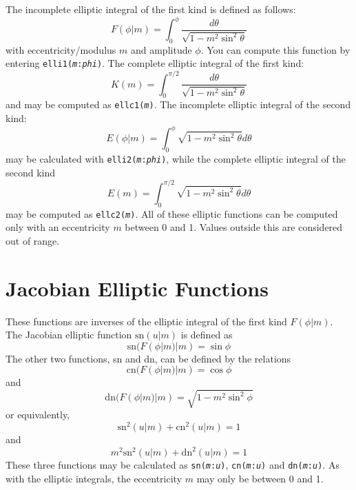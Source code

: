 \documentclass{article}
\begin{document}
The incomplete elliptic integral of the first kind is defined as
follows:
\begin{equation}
F(\phi | m) = \int^\phi_0 \frac{d\theta}{\sqrt{1 - m^2 \sin^2 \theta}}
\end{equation}
with eccentricity/modulus $m$ and amplitude $\phi$.  You can compute
this function by entering \texttt{elli1(\textsl{m}:\textsl{phi})}.
The complete elliptic integral of the first kind:
\begin{equation}
K(m) = \int^{\pi/2}_0 \frac{d\theta}{\sqrt{1 - m^2 \sin^2 \theta}}
\end{equation}
and may be computed as \texttt{ellc1(\textsl{m})}.  The incomplete
elliptic integral of the second kind:
\begin{equation}
E(\phi | m) = \int^\phi_0 \sqrt{1 - m^2 \sin^2 \theta} d\theta
\end{equation}
may be calculated with \texttt{elli2(\textsl{m}:\textsl{phi})}, while
the complete elliptic integral of the second kind
\begin{equation}
E(m) = \int^{\pi/2}_0 \sqrt{1 - m^2 \sin^2 \theta} d\theta
\end{equation}
may be computed as \texttt{ellc2(\textsl{m})}.  All of these elliptic
functions can be computed only with an eccentricity $m$ between 0 and
1.  Values outside this are considered out of range.

\section*{Jacobian Elliptic Functions}

These functions are inverses of the elliptic integral of the first
kind $F(\phi | m)$.  The Jacobian elliptic function $\mathrm{sn}(u|m)$
is defined as
\begin{equation}
\mathrm{sn}(F(\phi | m) | m) = \sin \phi
\end{equation}
The other two functions, sn and dn, can be defined by the relations
\begin{equation}
\mathrm{cn}(F(\phi | m) | m) = \cos \phi
\end{equation}
and
\begin{equation}
\mathrm{dn}(F(\phi | m) | m) = \sqrt{1-m^2\sin^2 \phi}
\end{equation}
or equivalently,
\begin{equation}
\mathrm{sn}^2(u | m) + \mathrm{cn}^2(u | m) = 1
\end{equation}
and
\begin{equation}
m^2\mathrm{sn}^2(u | m) + \mathrm{dn}^2(u | m) = 1
\end{equation}
These three functions may be calculated as
\texttt{sn(\textsl{m}:\textsl{u})}, \texttt{cn(\textsl{m}:\textsl{u})} and 
\texttt{dn(\textsl{m}:\textsl{u})}.  As with the elliptic
integrals, the eccentricity $m$ may only be between 0 and 1.
\end{document}
